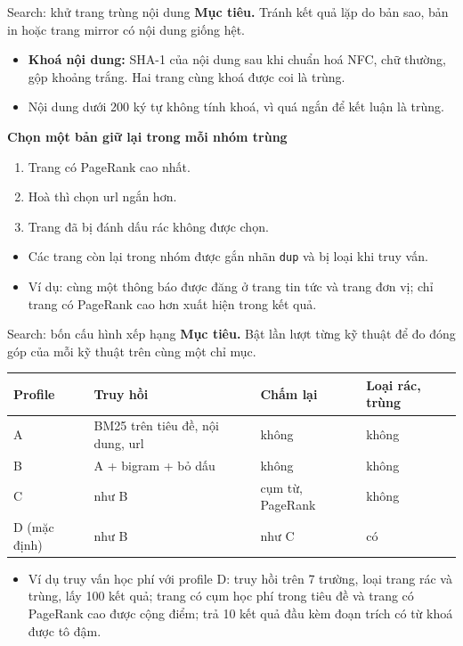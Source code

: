 \documentclass[aspectratio=169,t,10pt]{beamer}
\newcommand{\code}[1]{\texttt{#1}}
\newcommand{\muctieu}[1]{\noindent\textbf{Mục tiêu.} #1\par\vspace{4pt}}
\begin{document}
\begin{frame}{Search: khử trang trùng nội dung}
\small
\muctieu{Tránh kết quả lặp do bản sao, bản in hoặc trang mirror có nội dung giống hệt.}
\begin{itemize}
  \item \textbf{Khoá nội dung:} SHA-1 của nội dung sau khi chuẩn hoá NFC, chữ thường, gộp khoảng trắng. Hai trang cùng khoá được coi là trùng.
  \item Nội dung dưới 200 ký tự không tính khoá, vì quá ngắn để kết luận là trùng.
\end{itemize}
\vspace{4pt}
\textbf{Chọn một bản giữ lại trong mỗi nhóm trùng}
\begin{enumerate}
  \item Trang có PageRank cao nhất.
  \item Hoà thì chọn url ngắn hơn.
  \item Trang đã bị đánh dấu rác không được chọn.
\end{enumerate}
\vspace{4pt}
\begin{itemize}
  \item Các trang còn lại trong nhóm được gắn nhãn \code{dup} và bị loại khi truy vấn.
  \item Ví dụ: cùng một thông báo được đăng ở trang tin tức và trang đơn vị; chỉ trang có PageRank cao hơn xuất hiện trong kết quả.
\end{itemize}
\end{frame}

\begin{frame}{Search: bốn cấu hình xếp hạng}
\small
\muctieu{Bật lần lượt từng kỹ thuật để đo đóng góp của mỗi kỹ thuật trên cùng một chỉ mục.}
\renewcommand{\arraystretch}{1.4}
\begin{tabularx}{\textwidth}{@{}P{1.5cm}YP{3.3cm}P{2.3cm}@{}}
\toprule
\textbf{Profile} & \textbf{Truy hồi} & \textbf{Chấm lại} & \textbf{Loại rác, trùng}\\
\midrule
A & BM25 trên tiêu đề, nội dung, url & không & không\\
B & A + bigram + bỏ dấu & không & không\\
C & như B & cụm từ, PageRank & không\\
D (mặc định) & như B & như C & có\\
\bottomrule
\end{tabularx}
\vspace{6pt}
\begin{itemize}
  \item Ví dụ truy vấn học phí với profile D: truy hồi trên 7 trường, loại trang rác và trùng, lấy 100 kết quả; trang có cụm học phí trong tiêu đề và trang có PageRank cao được cộng điểm; trả 10 kết quả đầu kèm đoạn trích có từ khoá được tô đậm.
\end{itemize}
\end{frame}
\end{document}
